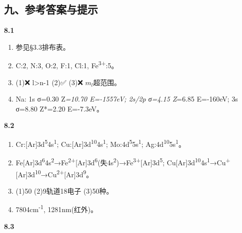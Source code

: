 \documentclass[a4paper,11pt]{ctexart}
\begin{document}
\subsection{九、参考答案与提示}\label{ux4e5dux53c2ux8003ux7b54ux6848ux4e0eux63d0ux793a}

\textbf{8.1}

\begin{enumerate}
\def\labelenumi{\arabic{enumi}.}
\item
  参见§3.3排布表。
\item
  C:2, N:3, O:2, F:1, Cl:1, Fe\textsuperscript{3+}:5。
\item
  (1)❌ l\textgreater n-1 (2)✅ (3)❌ \(m_l\)超范围。
\item
  Na: 1s σ=0.30 Z\emph{=10.70 E=-1557eV; 2s/2p σ=4.15 Z}=6.85 E=-160eV; 3s σ=8.80 Z*=2.20 E=-7.3eV。
\end{enumerate}

\textbf{8.2}

\begin{enumerate}
\def\labelenumi{\arabic{enumi}.}
\setcounter{enumi}{4}
\item
  Cr:{[}Ar{]}3d\textsuperscript{5}4s\textsuperscript{1}; Cu:{[}Ar{]}3d\textsuperscript{10}4s\textsuperscript{1}; Mo:4d\textsuperscript{5}5s\textsuperscript{1}; Ag:4d\textsuperscript{10}5s\textsuperscript{1}。
\item
  Fe{[}Ar{]}3d\textsuperscript{6}4s\textsuperscript{2}→Fe\textsuperscript{2+}{[}Ar{]}3d\textsuperscript{6}(失4s\textsuperscript{2})→Fe\textsuperscript{3+}{[}Ar{]}3d\textsuperscript{5}; Cu{[}Ar{]}3d\textsuperscript{10}4s\textsuperscript{1}→Cu\textsuperscript{+}{[}Ar{]}3d\textsuperscript{10}→Cu\textsuperscript{2+}{[}Ar{]}3d\textsuperscript{9}。
\item
  (1)50 (2)9轨道18电子 (3)50种。
\item
  7804cm\textsuperscript{-1}, 1281nm(红外)。
\end{enumerate}

\textbf{8.3}
\end{document}
